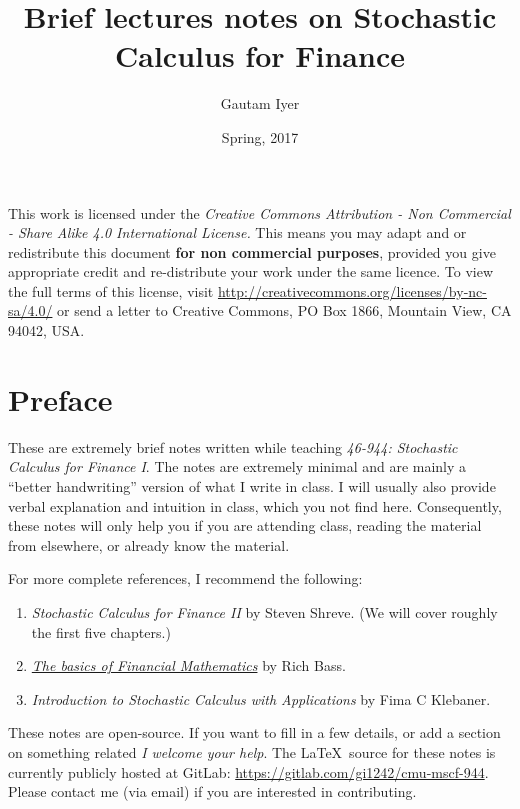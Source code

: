 
\frontmatter
\title{Brief lectures notes on Stochastic Calculus for Finance}
\author{Gautam Iyer}
\date{Spring, 2017}
\hypersetup{pageanchor=false}
\maketitle%

This work is licensed under the \emph{Creative Commons Attribution - Non Commercial - Share Alike 4.0 International License.}
This means you may adapt and or redistribute this document \textbf{for non commercial purposes}, provided you give appropriate credit and re-distribute your work under the same licence.
To view the full terms of this license, visit \url{http://creativecommons.org/licenses/by-nc-sa/4.0/} or send a letter to Creative Commons, PO Box 1866, Mountain View, CA 94042, USA.
\maketitle

\chapter*{Preface}

These are extremely brief notes written while teaching \emph{46-944: Stochastic Calculus for Finance I}.
The notes are extremely minimal and are mainly a ``better handwriting'' version of what I write in class.
I will usually also provide verbal explanation and intuition in class, which you  not find here.
Consequently, these notes will only help you if you are attending class, reading the material from elsewhere, or already know the material.

For more complete references, I recommend the following:
\begin{enumerate}
  \item
    \emph{Stochastic Calculus for Finance II} by Steven Shreve.
    (We will cover roughly the first five chapters.)
  \item 
    \emph{\href{http://bass.math.uconn.edu/finlmath.pdf}{The basics of Financial Mathematics}} by Rich Bass.
  \item
    \emph{Introduction to Stochastic Calculus with Applications} by Fima C Klebaner.
\end{enumerate}

\bigskip

\begin{note}[Contributing]
  These notes are open-source.
  If you want to fill in a few details, or add a section on something related \emph{I welcome your help}.
  The \LaTeX\ source for these notes is currently publicly hosted at GitLab: \url{https://gitlab.com/gi1242/cmu-mscf-944}.
  Please contact me (via email) if you are interested in contributing.
\end{note}

\tableofcontents\thispagestyle{empty}
\mainmatter
\hypersetup{pageanchor=true}

